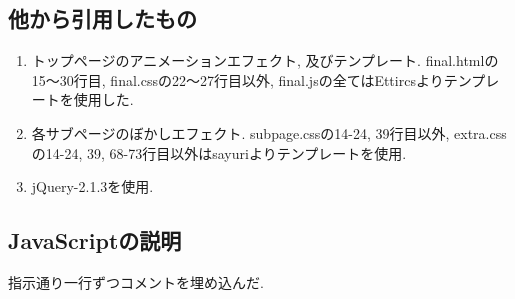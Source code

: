 \documentclass{jarticle}
\begin{document}
\subsection{他から引用したもの}
\begin{enumerate}
	\item 
	トップページのアニメーションエフェクト, 及びテンプレート. final.htmlの15〜30行目, final.cssの22〜27行目以外, final.jsの全てはEttircs\cite{ettrics}よりテンプレートを使用した.
	\item 
	各サブページのぼかしエフェクト. subpage.cssの14-24, 39行目以外, extra.cssの14-24, 39, 68-73行目以外はsayuri\cite{sayuri}よりテンプレートを使用.
	\item
	jQuery-2.1.3を使用.
\end{enumerate}

\subsection{JavaScriptの説明}
指示通り一行ずつコメントを埋め込んだ.
\end{document}
